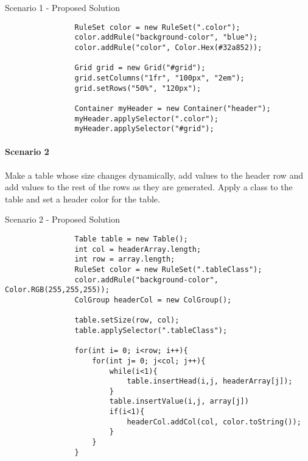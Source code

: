 \documentclass[12pt]{article}
\begin{document}
        \begin{shaded}
            Scenario 1 - Proposed Solution
            \begin{lstlisting}
                RuleSet color = new RuleSet(".color");
                color.addRule("background-color", "blue");
                color.addRule("color", Color.Hex(#32a852));

                Grid grid = new Grid("#grid");
                grid.setColumns("1fr", "100px", "2em");
                grid.setRows("50%", "120px");

                Container myHeader = new Container("header");
                myHeader.applySelector(".color");
                myHeader.applySelector("#grid");
            \end{lstlisting}
        \end{shaded}

        \paragraph{Scenario 2}
        Make a table whose size changes dynamically, add values to the header row and add values to the rest of the rows as they are generated. Apply a class to the table and set a header color for the table.

        \begin{shaded}
            Scenario 2 - Proposed Solution
            \begin{lstlisting}
                Table table = new Table();
                int col = headerArray.length;
                int row = array.length;
                RuleSet color = new RuleSet(".tableClass");
                color.addRule("background-color", Color.RGB(255,255,255));
                ColGroup headerCol = new ColGroup();

                table.setSize(row, col);
                table.applySelector(".tableClass");

                for(int i= 0; i<row; i++){
                    for(int j= 0; j<col; j++){
                        while(i<1){
                            table.insertHead(i,j, headerArray[j]);
                        }
                        table.insertValue(i,j, array[j])
                        if(i<1){
                            headerCol.addCol(col, color.toString());
                        }
                    }
                }
            \end{lstlisting}
        \end{shaded}
\end{document}

